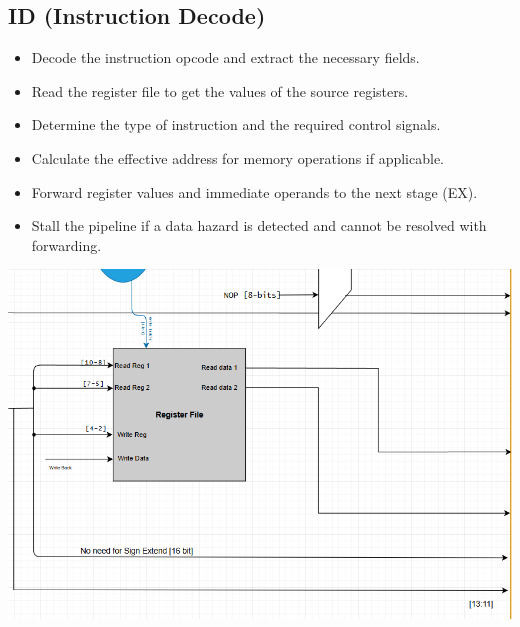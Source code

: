 \documentclass{report}
\begin{document}
\subsection*{ID (Instruction Decode)}
\begin{minipage}{0.6\textwidth}
\begin{itemize}
    \item Decode the instruction opcode and extract the necessary fields.
    \item Read the register file to get the values of the source registers.
    \item Determine the type of instruction and the required control signals.
    \item Calculate the effective address for memory operations if applicable.
    \item Forward register values and immediate operands to the next stage (EX).
    \item Stall the pipeline if a data hazard is detected and cannot be resolved with forwarding.
\end{itemize}
\end{minipage}
\begin{minipage}{0.35\textwidth}
\begin{center}
    \includegraphics[width=\textwidth]{./assets/ID.png}
\end{center}
\end{minipage}
\end{document}
